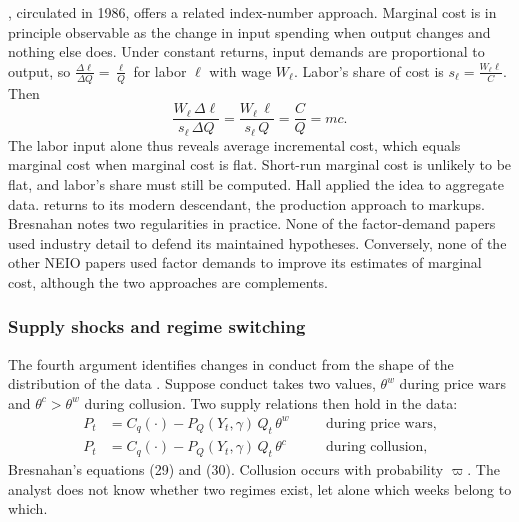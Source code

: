 \citet{Hall1988}, circulated in 1986, offers a related index-number approach. Marginal cost is in principle observable
as the change in input spending when output changes and nothing else does. Under constant returns, input demands are
proportional to output, so $\frac{\Delta \ell}{\Delta Q} = \frac{\ell}{Q}$ for labor $\ell$ with wage $W_\ell$. Labor's
share of cost is $s_\ell = \frac{W_\ell \ell}{C}$. Then
\begin{equation*}
\frac{W_\ell\,\Delta \ell}{s_\ell\,\Delta Q} = \frac{W_\ell\, \ell}{s_\ell\, Q} = \frac{C}{Q} = mc .
\end{equation*}
The labor input alone thus reveals average incremental cost, which equals marginal cost when marginal cost is flat.
Short-run marginal cost is unlikely to be flat, and labor's share must still be computed. Hall applied the idea to
aggregate data.  returns to its modern descendant, the production approach to markups.
Bresnahan notes two regularities in practice. None of the factor-demand papers used industry detail to defend its
maintained hypotheses. Conversely, none of the other NEIO papers used factor demands to improve its estimates of
marginal cost, although the two approaches are complements.

\subsubsection{Supply shocks and regime switching}\label{sec:01-id-regimes}

The fourth argument identifies changes in conduct from the shape of the distribution of the data
\citep[Section~3.4]{Bresnahan1989}. Suppose conduct takes two values, $\theta^{w}$ during price wars and
$\theta^{c} > \theta^{w}$ during collusion. Two supply relations then hold in the data:
\begin{equation}\label{eq:01-regimes}
\begin{aligned}
P_t &= C_q(\cdot) - P_Q(Y_t, \gamma)\, Q_t\, \theta^{w} \quad &&\text{during price wars},\\
P_t &= C_q(\cdot) - P_Q(Y_t, \gamma)\, Q_t\, \theta^{c} \quad &&\text{during collusion},
\end{aligned}
\end{equation}
Bresnahan's equations (29) and (30). Collusion occurs with probability $\varpi$. The analyst does not know whether two
regimes exist, let alone which weeks belong to which.

